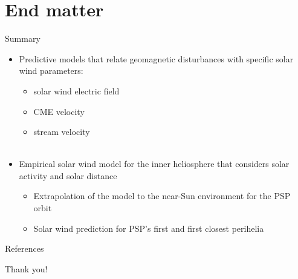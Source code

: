\section{End matter}

\begin{frame}[c]{Summary}{}
	
	\begin{itemize}%
		\item Predictive models that relate geomagnetic disturbances with specific solar wind parameters:
		\begin{itemize}
			\item solar wind electric field
			\item CME velocity
			\item stream velocity\\\ 
		\end{itemize}
		\item Empirical solar wind model for the inner heliosphere that considers solar activity and solar distance
		\begin{itemize}%
			\item Extrapolation of the model to the near-Sun environment for the PSP orbit
			\item Solar wind prediction for PSP's first and first closest perihelia
		\end{itemize}
	\end{itemize}
	
\end{frame}
\begin{frame}[t,allowframebreaks]{References}
	\tiny
	\begin{thebibliography}{10}
	
		\beamertemplatebookbibitems
		
		\beamertemplatearticlebibitems
		
		

	\end{thebibliography}
\end{frame}
{
\begin{frame}[c,plain]{}{}
	\centering
	\Large Thank you!
\end{frame}
}


